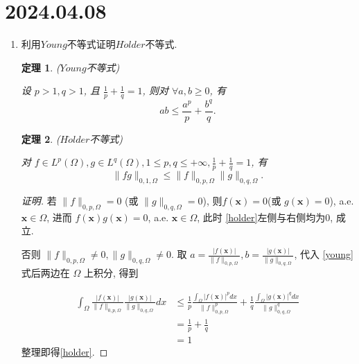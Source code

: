 \documentclass[12pt,a4paper]{article}
\newtheorem{theorem}{定理}
\begin{document}
	
	\noindent
	
	\section*{2024.04.08}	
	

	\begin{enumerate}
		\item 利用$Young$不等式证明$H\ddot{o}lder$不等式.
		
		\begin{theorem}{($Young$不等式)}
			
			设 $p>1, q>1$, 且 $\frac{1}{p}+\frac{1}{q}=1$, 则对 $\forall a, b \geq 0$, 有
			\begin{equation} 
				a b \leq \frac{a^p}{p}+\frac{b^q}{q} .\label{young}
			\end{equation}
		\end{theorem}
		
		\begin{theorem}{($H\ddot{o}lder$不等式)}
		
		对 $f \in L^p(\Omega), g \in L^q(\Omega), 1 \leqslant p, q \leqslant+\infty, \frac{1}{p}+\frac{1}{q}=1$, 有
		\begin{equation}
			\|f g\|_{0,1, \Omega} \leqslant\|f\|_{0, p, \Omega}\|g\|_{0, q, \Omega} .\label{holder}
		\end{equation}
		
		
		\end{theorem}
		
		\begin{proof}[证明]
		
		若 $\|f\|_{0, p, \Omega}=0$ (或 $\|g\|_{0, q, \Omega}=0$), 则$f(\boldsymbol{x}) = 0$(或 $g(\boldsymbol{x})=0$), a.e. $\boldsymbol{x} \in \Omega$, 进而 $f(\boldsymbol{x}) g(\boldsymbol{x})=0$, a.e. $\boldsymbol{x} \in \Omega$, 此时 \eqref{holder}左侧与右侧均为0, 成立.
			
		否则 $\|f\|_{0, p, \Omega} \neq 0,\|g\|_{0, q, \Omega} \neq 0$. 取 $a=\frac{|f(\boldsymbol{x})|}{\|f\|_{0, p, \Omega}}, b=\frac{|g(\boldsymbol{x})|}{\|g\|_{0, q, \Omega}}$, 代入 \eqref{young}式后两边在 $\Omega$ 上积分, 得到 
		
		\begin{equation*}
			\begin{aligned}
				\int_{\Omega}\frac{|f(\boldsymbol{x})|}{\|f\|_{0, p, \Omega}}\frac{|g(\boldsymbol{x})|}{\|g\|_{0, q, \Omega}} dx &\leq \frac{1}{p} \frac{\int_{\Omega}|f(\boldsymbol{x})|^p dx}{\|f\|_{0, p, \Omega}^p} + \frac{1}{q} \frac{\int_{\Omega}|g(\boldsymbol{x})|^q dx}{\|g\|_{0, q, \Omega}^q}\\
				& = \frac{1}{p}+\frac{1}{q}\\
				& = 1
			\end{aligned} 
		\end{equation*}
		整理即得\eqref{holder}.
		

\end{proof}
\end{enumerate}
\end{document}
